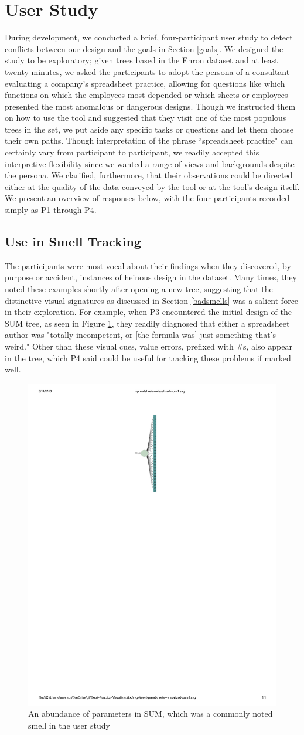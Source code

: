 \documentclass[conference]{IEEEtran}
\begin{document}
	\section{User Study} \label{sec:userstudy} During development, we conducted a
	brief, four-participant user study to detect conflicts between our
	design and the goals in Section \ref{goals}. We designed the study to be
	exploratory; given trees based in the Enron dataset and at least twenty
	minutes, we asked the participants to adopt the persona of a consultant
	evaluating a company's spreadsheet practice, allowing for questions like which
	functions on which the employees most depended or which sheets or employees
	presented the most anomalous or dangerous designs. Though we instructed them on
	how to use the tool and suggested that they visit one of the most populous
	trees in the set, we put aside any specific tasks or questions and let them
	choose their own paths. Though interpretation of the phrase ``spreadsheet
	practice" can certainly vary from participant to participant, we readily
	accepted this interpretive flexibility since we wanted a range of views and
	backgrounds despite the persona. We clarified, furthermore, that their
	observations could be directed either at the quality of the data conveyed by
	the tool or at the tool's design itself. We present an overview of responses below, with the four participants
	recorded simply as P1 through P4. \par
	
	\subsection{Use in Smell Tracking} 
	
	The participants were most vocal about their findings when they discovered, by
	purpose or accident, instances of heinous design in the dataset. Many times,
	they noted these examples shortly after opening a new tree, suggesting that the
	distinctive visual signatures as discussed in Section \ref{badsmells} was a
	salient force in their exploration. For example, when P3 encountered the
	initial design of the SUM tree, as seen in Figure \ref{fig:sum}, they readily
	diagnosed that either a spreadsheet author was "totally incompetent, or [the
	formula was] just something that's weird." Other than these visual cues, value
	errors, prefixed with \#s, also appear in the tree, which P4 said could be
	useful for tracking these problems if marked well.
	
	\begin{figure}
		\centering \includegraphics[width=.20\textwidth]{SUM}  \caption{An abundance of parameters in SUM, which was a commonly noted smell in the user study} \label{fig:sum} \end{figure}
	
\end{document}
